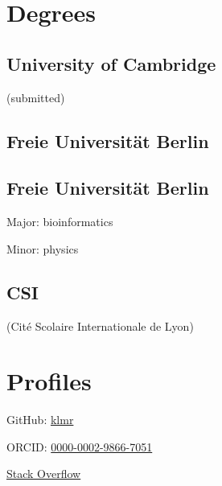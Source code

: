 \documentclass{klmr-cv}
\author{Konrad Rudolph}
\begin{document}
\maketitle

\sidebar

\section{Degrees}

\subsection{University of Cambridge}

\date{2011--now}
\item{ (submitted)}

\subsection{Freie Universität Berlin}

\date{2011}
\item{}

\subsection{Freie Universität Berlin}

\date{2008}
\item{}
\item{Major: bioinformatics}
\item{Minor: physics}

\subsection{CSI}

\item{(Cité Scolaire Internationale de Lyon)}
\date{2003}
\item{}

\section{Profiles}

\item{GitHub: \href{http://github.com/klmr}{klmr}}
\item{ORCID:
    {\footnotesize\href{http://orcid.org/0000-0002-9866-7051}{0000-0002-9866-7051}}}
\item{\href{http://stackoverflow.com/users/1968/konrad-rudolph}{Stack Overflow}}
\end{document}
